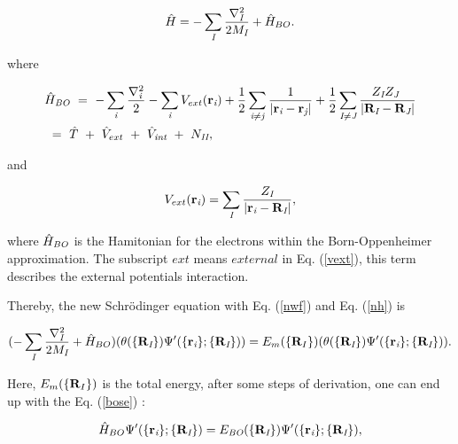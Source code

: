 \documentclass[a4paper, 12pt, titlepage,oneside,drop]{kthesis}
\begin{document}
\begin{equation}\label{nh}
 {\hath} = - \sumi<I> \frac{{{\nabla}_{\textit{I}}^{2}}}{2 M_\textit{I}} + {\hath}_{BO}.
\end{equation}

where 

\begin{equation}\label{both}\begin{split}
&{\hath}_\textit{BO}\ =\ - \sumi<i>   \frac{{{\nabla}_{\textit{i}}^{2}}}{2}  - \sumi<i> V_{ext}(\textbf{r}_{\textit{i}})  + \frac{1}{2} \suminj<i><j> \frac{1}{ |\textbf{r}_\textit{i}-\textbf{r}_\textit{j}|} + \frac{1}{2} \suminj<I><J> \frac{Z_\textit{I} Z_\textit{J}\ }{|\textbf{R}_\textit{I}-\textbf{R}_\textit{J}|} \\
&\ = \ \hat{T} \ + \ \hat{V}_{ext} \ + \ \hat{V}_\textit{int}\ + \ N_\textit{II},
\end{split}\end{equation}

and

\begin{equation}\label{vext}
V_{ext}(\textbf{r}_{\textit{i}}) =  \sumi<I> \frac{Z_\textit{I}}{|\textbf{r}_\textit{i}-\textbf{R}_\textit{I}|},
\end{equation}

\noindent where ${\hat{H}}_\textit{BO}$  is the Hamitonian for the electrons within the Born-Oppenheimer approximation. The subscript $ext$ means $external$ in Eq. (\ref{vext}), this term describes the external potentials interaction. 

\noindent Thereby, the new Schrödinger equation with Eq. (\ref{nwf}) and Eq. (\ref{nh}) is 

\begin{equation}
 (- \sumi<I> \frac{{{\nabla}_{\textit{I}}^{2}}}{2 M_\textit{I}} + {\hath}_{BO} ) ({\theta(\{{\textbf R}_{\textit I}\})} {\Psi'(\{\textbf{r}_{\textit i}\}; \{{\textbf R}_{\textit I}\})}) = E_{m}(\{{\textbf R_I}\}) ({\theta(\{{\textbf R}_{\textit I}\})} {\Psi'(\{\textbf{r}_{\textit i}\}; \{{\textbf R}_{\textit I}\})}).
\end{equation}
 
\noindent Here, $E_{m}(\{{\textbf R_I}\})$ is the total energy, after some steps of derivation, one can end up with the Eq. (\ref{bose}) :

\begin{equation}\label{bose}
{\hat{H}}_{BO} {\Psi'(\{\textbf{r}_{\textit i}\}; \{{\textbf R}_{\textit I}\})} = E_\textit{BO}{(\{\textbf{R}_{\textit I}\})} {\Psi'(\{\textbf{r}_{\textit i}\}; \{{\textbf R}_{\textit I}\})},
\end{equation}
\end{document}
